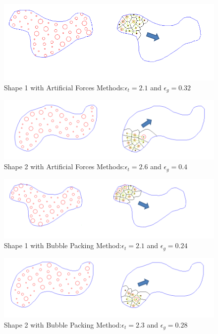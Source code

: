 \begin{figure}[H]
\caption{Shape 1 with Artificial Forces Methods:$\epsilon_t = 2.1$ and $\epsilon_g = 0.32$} \label{fififi1}
\centerline{\includegraphics[scale = 0.70]{Artificial_Forces_Mesh_1}}
\end{figure} 		
		
\begin{figure}[H]
\caption{Shape 2 with Artificial Forces Methods:$\epsilon_t = 2.6$ and $\epsilon_g = 0.4$}
\label{fififi2}
\centerline{\includegraphics[scale = 0.65]{Artificial_Forces_Mesh_2}}
\end{figure} 		
		
\begin{figure}[H]
\caption{Shape 1 with Bubble Packing Method:$\epsilon_t = 2.1$ and $\epsilon_g = 0.24$}
\label{fififi3}
\centerline{\includegraphics[scale = 0.70]{Bubble_Packing_Mesh_1}}
\end{figure} 	
				
\begin{figure}[H]
\caption{Shape 2 with Bubble Packing Method:$\epsilon_t = 2.3$ and $\epsilon_g = 0.28$}
\label{fififi4}
\centerline{\includegraphics[scale = 0.65]{Bubble_Packing_Mesh_2}}
\end{figure} 			
						
